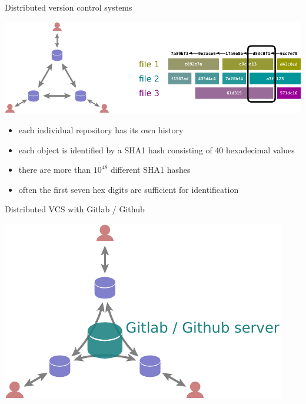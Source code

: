 \documentclass[svgnames]{beamer}
\begin{document}
\begin{frame}{Distributed version control systems}
 \begin{center}
  \includegraphics[width=\textwidth]{dvcs}
 \end{center}

 \begin{itemize}
  \item each individual repository has its own history
  \item each object is identified by a SHA1 hash consisting of
	40 hexadecimal values
  \item there are more than $10^{48}$ different SHA1 hashes
  \item often the first seven hex digits are sufficient for identification
 \end{itemize}
\end{frame}

\begin{frame}{Distributed VCS with Gitlab / Github}
 \begin{center}
  \includegraphics[height=0.6\textheight]{dvcs-github}
 \end{center}
\end{frame}
\end{document}
